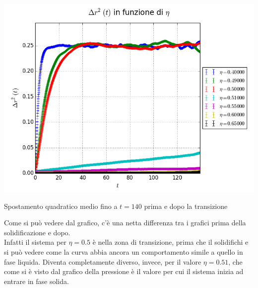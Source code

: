 \begin{myfig}[h!]
	\includegraphics[scale=0.55]{sfere3D/dr2trans.png}
	\caption{Spostamento quadratico medio fino a $t=140$ prima e dopo la transizione}
\end{myfig}

Come si può vedere dal grafico, c'è una netta differenza tra i grafici prima della solidificazione e dopo.\\
Infatti il sistema per $\eta=0.5$ è nella zona di transizione, prima che il solidifichi e si può vedere come la curva abbia ancora un comportamento simile a quello in fase liquida.
Diventa completamente diverso, invece, per il valore $\eta=0.51$, che come si è visto dal grafico della pressione è il valore per cui il sistema inizia ad entrare in fase solida.



